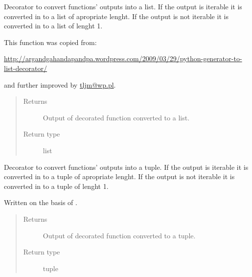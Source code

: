 \documentclass[a4paper,10pt,english]{sphinxmanual}
\begin{document}

\begin{fulllineitems}
\label{aqueduct.utils.helpers:aqueduct.utils.helpers.listify}
Decorator to convert functions' outputs into a list. If the output is iterable it is converted in to a list
of apropriate lenght. If the output is not iterable it is converted in to a list of lenght 1.

This function was copied from:

\href{http://argandgahandapandpa.wordpress.com/2009/03/29/python-generator-to-list-decorator/}{http://argandgahandapandpa.wordpress.com/2009/03/29/python-generator-to-list-decorator/}

and further improved by \href{mailto:tljm@wp.pl}{tljm@wp.pl}.
\begin{quote}\begin{description}
\item[{Returns}] \leavevmode
Output of decorated function converted to a list.

\item[{Return type}] \leavevmode
list

\end{description}\end{quote}

\end{fulllineitems}


\begin{fulllineitems}
\label{aqueduct.utils.helpers:aqueduct.utils.helpers.tupleify}
Decorator to convert functions' outputs into a tuple. If the output is iterable it is converted in to a tuple
of apropriate lenght. If the output is not iterable it is converted in to a tuple of lenght 1.

Written on the basis of {\hyperref[aqueduct.utils.helpers:aqueduct.utils.helpers.listify]{}}.
\begin{quote}\begin{description}
\item[{Returns}] \leavevmode
Output of decorated function converted to a tuple.

\item[{Return type}] \leavevmode
tuple

\end{description}\end{quote}

\end{fulllineitems}
\end{document}
